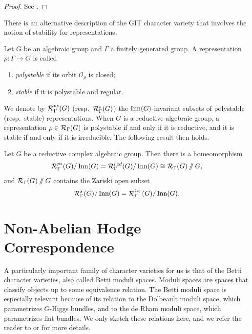 \begin{proof}
    See \cite[Thm.~4]{casimiroCharacterVarietiesTheir2026}.
\end{proof}

There is an alternative description of the GIT character variety that involves the notion of stability for representations.

\begin{definition}
    Let $G$ be an algebraic group and $\Gamma$ a finitely generated group. A representation $\rho : \Gamma \to G$ is called
    \begin{enumerate}
        \item \emph{polystable} if its orbit $\mathcal{O}_\rho$ is closed;
        \item \emph{stable} if it is polystable and regular.
    \end{enumerate}
\end{definition}

We denote by $\RepVar{\Gamma}{G}[ps]$ (resp.\ $\RepVar{\Gamma}{G}[s]$) the $\operatorname{Inn}(G)$-invariant subsets of polystable (resp.\ stable) representations. When $G$ is a reductive algebraic group, a representation $\rho \in \RepVar{\Gamma}{G}$ is polystable if and only if it is reductive, and it is stable if and only if it is irreducible. The following result then holds.

\begin{theorem}
    Let $G$ be a reductive complex algebraic group. Then there is a homeomorphism
    \[
        \RepVar{\Gamma}{G}[ps] / \Inn(G) = \RepVar{\Gamma}{G}[red] / \Inn(G) \cong \RepVar{\Gamma}{G} \git G,
    \]
    and $\RepVar{\Gamma}{G} \git G$ contains the Zariski open subset
    \[
        \RepVar{\Gamma}{G}[s] / \Inn(G) = \RepVar{\Gamma}{G}[irr] / \Inn(G).
    \]
\end{theorem}



\section{Non-Abelian Hodge Correspondence}

A particularly important family of character varieties for us is that of the Betti character varieties, also called Betti moduli spaces. Moduli spaces are spaces that classify objects up to some equivalence relation. The Betti moduli space is especially relevant because of its relation to the Dolbeault moduli space, which parametrizes $G$-Higgs bundles, and to the de Rham moduli space, which parametrizes flat bundles. We only sketch these relations here, and we refer the reader to \cite{simpsonModuliRepresentationsFundamental1994, simpsonModuliRepresentationsFundamental1994a} or \cite[Chap.~4]{zamorasaizGeometricInvariantTheory2021} for more details.

